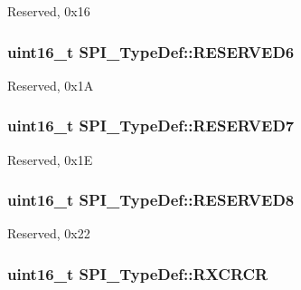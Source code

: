 Reserved, 0x16 \hypertarget{struct_s_p_i___type_def_a0870177921541602a44f744f1b66e823}{
\subsubsection[{R\-E\-S\-E\-R\-V\-E\-D6}]{\setlength{\rightskip}{0pt plus 5cm}uint16\-\_\-t S\-P\-I\-\_\-\-Type\-Def\-::\-R\-E\-S\-E\-R\-V\-E\-D6}}\label{struct_s_p_i___type_def_a0870177921541602a44f744f1b66e823}
Reserved, 0x1\-A \hypertarget{struct_s_p_i___type_def_a98df0a538eb077b2cfc5194eda200f1b}{
\subsubsection[{R\-E\-S\-E\-R\-V\-E\-D7}]{\setlength{\rightskip}{0pt plus 5cm}uint16\-\_\-t S\-P\-I\-\_\-\-Type\-Def\-::\-R\-E\-S\-E\-R\-V\-E\-D7}}\label{struct_s_p_i___type_def_a98df0a538eb077b2cfc5194eda200f1b}
Reserved, 0x1\-E \hypertarget{struct_s_p_i___type_def_a0ffe762827b71caff20c75bf105387f6}{
\subsubsection[{R\-E\-S\-E\-R\-V\-E\-D8}]{\setlength{\rightskip}{0pt plus 5cm}uint16\-\_\-t S\-P\-I\-\_\-\-Type\-Def\-::\-R\-E\-S\-E\-R\-V\-E\-D8}}\label{struct_s_p_i___type_def_a0ffe762827b71caff20c75bf105387f6}
Reserved, 0x22 \hypertarget{struct_s_p_i___type_def_ab53da6fb851d911ae0b1166be2cfe48a}{
\subsubsection[{R\-X\-C\-R\-C\-R}]{ uint16\-\_\-t S\-P\-I\-\_\-\-Type\-Def\-::\-R\-X\-C\-R\-C\-R}}\label{struct_s_p_i___type_def_ab53da6fb851d911ae0b1166be2cfe48a}
